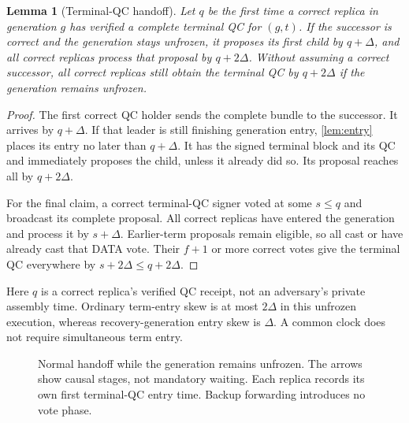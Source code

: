 \documentclass[11pt,a4paper]{article}
\newtheorem{lemma}[lemma]{Lemma}
\begin{document}
\begin{lemma}[Terminal-QC handoff]
\label{lem:handoff}
Let $q$ be the first time a correct replica in generation $g$ has verified
a complete terminal QC for $(g,t)$. If the successor is correct and the
generation stays unfrozen, it proposes its first child by $q+\Delta$,
and all correct replicas process that proposal by $q+2\Delta$.
Without assuming a correct successor, all correct replicas still obtain
the terminal QC by $q+2\Delta$ if the generation remains unfrozen.
\end{lemma}
\begin{proof}
The first correct QC holder sends the complete bundle to the successor.
It arrives by $q+\Delta$. If that leader is still finishing generation
entry, \cref{lem:entry} places its entry no later than $q+\Delta$.
It has the signed terminal block and its QC and immediately proposes
the child, unless it already did so. Its proposal reaches all by
$q+2\Delta$.

For the final claim, a correct terminal-QC signer voted at some $s\le q$
and broadcast its complete proposal. All correct replicas have entered
the generation and process it by $s+\Delta$. Earlier-term proposals
remain eligible, so all cast or have already cast that DATA vote.
Their $f+1$ or more correct votes give the terminal QC everywhere by
$s+2\Delta\le q+2\Delta$.
\end{proof}
Here $q$ is a correct replica's verified QC receipt, not an adversary's
private assembly time. Ordinary term-entry skew is at most $2\Delta$
in this unfrozen execution, whereas recovery-generation entry skew is
$\Delta$. A common clock does not require simultaneous term entry.

\begin{figure}[htbp]\centering
{}
\caption{Normal handoff while the generation remains unfrozen. The arrows
show causal stages, not mandatory waiting. Each replica records its own
first terminal-QC entry time. Backup forwarding introduces no vote phase.}
\label{fig:handoff}
\end{figure}
\end{document}
